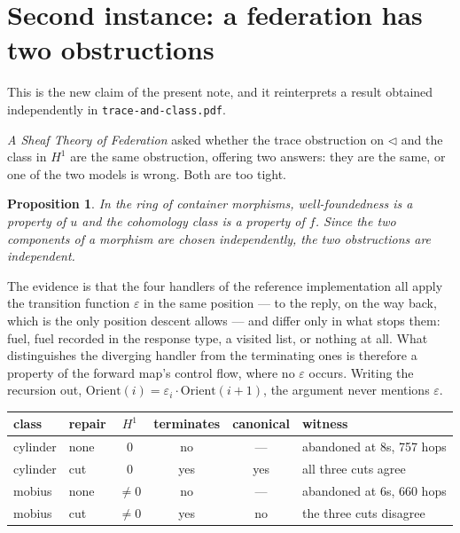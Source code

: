\documentclass[11pt,a4paper]{article}
\newtheorem{proposition}[theorem]{Proposition}
\theoremstyle{definition}
\theoremstyle{remark}
\newcommand{\con}{\triangleleft}
\begin{document}
\section{Second instance: a federation has two obstructions}

This is the new claim of the present note, and it reinterprets a result obtained
independently in \texttt{trace-and-class.pdf}.

\emph{A Sheaf Theory of Federation} asked whether the trace obstruction on
$\con$ and the class in $H^1$ are the same obstruction, offering two answers:
they are the same, or one of the two models is wrong. Both are too tight.

\begin{proposition}\label{prop:fed}
In the ring of container morphisms, well-foundedness is a property of $u$ and the
cohomology class is a property of $f$. Since the two components of a morphism are
chosen independently, the two obstructions are independent.
\end{proposition}

The evidence is that the four handlers of the reference implementation all apply
the transition function $\varepsilon$ in the same position --- to the reply, on
the way back, which is the only position descent allows --- and differ only in
what stops them: fuel, fuel recorded in the response type, a visited list, or
nothing at all. What distinguishes the diverging handler from the terminating
ones is therefore a property of the forward map's control flow, where no
$\varepsilon$ occurs. Writing the recursion out,
$\mathrm{Orient}(i) = \varepsilon_i \cdot \mathrm{Orient}(i+1)$, the argument
never mentions $\varepsilon$.

\begin{center}
\small
\begin{tabular}{llcccl}
\toprule
class & repair & $H^1$ & terminates & canonical & witness \\
\midrule
cylinder & none & $0$      & no  & ---  & abandoned at 8s, 757 hops \\
cylinder & cut  & $0$      & yes & yes  & all three cuts agree \\
mobius   & none & $\ne 0$  & no  & ---  & abandoned at 6s, 660 hops \\
mobius   & cut  & $\ne 0$  & yes & no   & the three cuts disagree \\
\bottomrule
\end{tabular}
\end{center}
\end{document}
